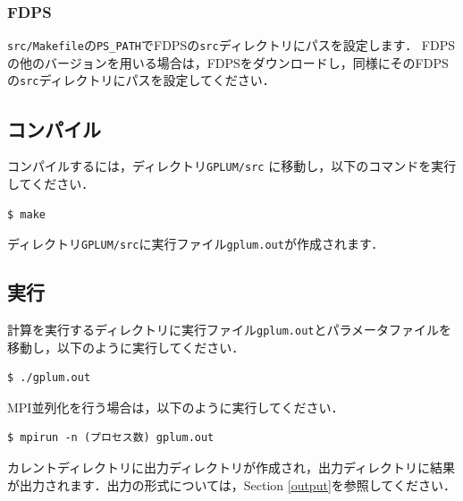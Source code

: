 \documentclass[12pt,a4paper,dvipdfmx]{jsarticle}
\newcommand{\ourcode}{GPLUM\xspace}
\begin{document}
\begin{description}


\end{description}

\subsubsection{FDPS}
\texttt{src/Makefile}の\texttt{PS\_PATH}でFDPSの\texttt{src}ディレクトリにパスを設定します．
FDPSの他のバージョンを用いる場合は，FDPSをダウンロードし，同様にそのFDPSの\texttt{src}ディレクトリにパスを設定してください．


\subsection{コンパイル\label{compile}}

コンパイルするには，ディレクトリ\texttt{\ourcode /src} に移動し，以下のコマンドを実行してください．
\begin{verbatim}
$ make
\end{verbatim}
ディレクトリ\texttt{\ourcode /src}に実行ファイル\texttt{gplum.out}が作成されます．



\subsection{実行}

計算を実行するディレクトリに実行ファイル\texttt{gplum.out}とパラメータファイルを移動し，以下のように実行してください．
\begin{verbatim}
$ ./gplum.out
\end{verbatim}
MPI並列化を行う場合は，以下のように実行してください．
\begin{verbatim}
$ mpirun -n (プロセス数) gplum.out
\end{verbatim}
カレントディレクトリに出力ディレクトリが作成され，出力ディレクトリに結果が出力されます．出力の形式については，Section \ref{output}を参照してください．
\end{document}
